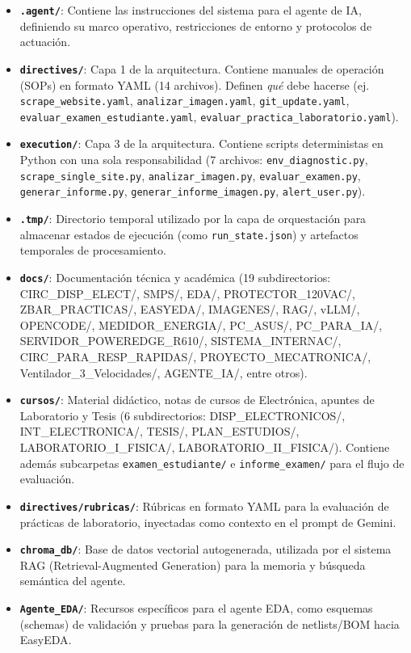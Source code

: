 \documentclass[12pt,a4paper]{article}
\begin{document}
\begin{itemize}
    \item \textbf{\texttt{.agent/}}: Contiene las instrucciones del sistema para el agente de IA, definiendo su marco operativo, restricciones de entorno y protocolos de actuación.
    \item \textbf{\texttt{directives/}}: Capa 1 de la arquitectura. Contiene manuales de operación (SOPs) en formato YAML (14 archivos). Definen \textit{qué} debe hacerse (ej. \texttt{scrape\_website.yaml}, \texttt{analizar\_imagen.yaml}, \texttt{git\_update.yaml}, \texttt{evaluar\_examen\_estudiante.yaml}, \texttt{evaluar\_practica\_laboratorio.yaml}).
    \item \textbf{\texttt{execution/}}: Capa 3 de la arquitectura. Contiene scripts deterministas en Python con una sola responsabilidad (7 archivos: \texttt{env\_diagnostic.py}, \texttt{scrape\_single\_site.py}, \texttt{analizar\_imagen.py}, \texttt{evaluar\_examen.py}, \texttt{generar\_informe.py}, \texttt{generar\_informe\_imagen.py}, \texttt{alert\_user.py}).
    \item \textbf{\texttt{.tmp/}}: Directorio temporal utilizado por la capa de orquestación para almacenar estados de ejecución (como \texttt{run\_state.json}) y artefactos temporales de procesamiento.
    \item \textbf{\texttt{docs/}}: Documentación técnica y académica (19 subdirectorios: CIRC\_DISP\_ELECT/, SMPS/, EDA/, PROTECTOR\_120VAC/, ZBAR\_PRACTICAS/, EASYEDA/, IMAGENES/, RAG/, vLLM/, OPENCODE/, MEDIDOR\_ENERGIA/, PC\_ASUS/, PC\_PARA\_IA/, SERVIDOR\_POWEREDGE\_R610/, SISTEMA\_INTERNAC/, CIRC\_PARA\_RESP\_RAPIDAS/, PROYECTO\_MECATRONICA/, Ventilador\_3\_Velocidades/, AGENTE\_IA/, entre otros).
    \item \textbf{\texttt{cursos/}}: Material didáctico, notas de cursos de Electrónica, apuntes de Laboratorio y Tesis (6 subdirectorios: DISP\_ELECTRONICOS/, INT\_ELECTRONICA/, TESIS/, PLAN\_ESTUDIOS/, LABORATORIO\_I\_FISICA/, LABORATORIO\_II\_FISICA/). Contiene además subcarpetas \texttt{examen\_estudiante/} e \texttt{informe\_examen/} para el flujo de evaluación.
    \item \textbf{\texttt{directives/rubricas/}}: Rúbricas en formato YAML para la evaluación de prácticas de laboratorio, inyectadas como contexto en el prompt de Gemini.
    \item \textbf{\texttt{chroma\_db/}}: Base de datos vectorial autogenerada, utilizada por el sistema RAG (Retrieval-Augmented Generation) para la memoria y búsqueda semántica del agente.
    \item \textbf{\texttt{Agente\_EDA/}}: Recursos específicos para el agente EDA, como esquemas (schemas) de validación y pruebas para la generación de netlists/BOM hacia EasyEDA.
\end{itemize}
\end{document}
